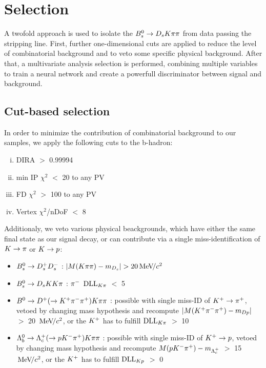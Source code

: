 \section{Selection}

A twofold approach is used to isolate the ${{B}^0_{s}}\rightarrow{\ensuremath{{D}_{s}}}{\ensuremath{K}}{\ensuremath{\pi}}{\ensuremath{\pi}}$ from data passing the stripping line. 
First, further one-dimensional cuts are applied to reduce the level of combinatorial background and to veto some specific physical background. 
After that, a multivariate analysis selection is performed, combining multiple variables to train a neural network and create a powerfull discriminator between signal and background. 

\subsection{Cut-based selection}

In order to minimize the contribution of combinatorial background to our samples, we apply the following cuts to the b-hadron:

\begin{enumerate}[(i)]

\item DIRA $>$ 0.99994

\item min IP $\chi^{2}$ $<$ 20 to any PV

\item FD $\chi^{2}$ $>$ 100 to any PV

\item Vertex $\chi^{2}$/nDoF $<$ 8 

\end{enumerate}    


Additionaly, we veto various physical beackgrounds, which have either the same final state as our signal decay, or can contribute via a single miss-identification of ${K}\rightarrow{\ensuremath{\pi}}$ or ${K}\rightarrow{\ensuremath{p}}$:

\begin{itemize}

\item ${{B}^0_{s}}\rightarrow{\ensuremath{{D}^+_{s}}}{\ensuremath{{D}^-_{s}}}$ : $|M({K}{\pi}{\pi}) - m_{{{D}_{s}}}| > 20 {\mathrm{\,Me\kern -0.1em V\!/}c^2}$ 

\item ${{B}^0_{s}}\rightarrow{\ensuremath{{D}_{s}}}{\ensuremath{K}}{\ensuremath{K}}{\ensuremath{\pi}}$ : ${{\pi}^-}$ $\mathrm{DLL}_{{K}{\pi}}$ $<$ 5 

\item ${{B}^0}\rightarrow{\ensuremath{{D}^+}}(\rightarrow{\ensuremath{{K}^+}}{\ensuremath{{\pi}^-}}{\ensuremath{{\pi}^+}}){K}{\pi}{\pi}$ : possible with single miss-ID of ${{K}^+}\rightarrow{\ensuremath{{\pi}^+}}$, vetoed by changing mass hypothesis and recompute $|M({{K}^+}{{\pi}^-}{{\pi}^+}) - m_{Dp}|$ $>$ 20 ${\mathrm{\,Me\kern -0.1em V\!/}c^2}$, 
or the ${{K}^+}$ has to fulfill $\mathrm{DLL}_{{K}{\pi}}$ $>$ 10

\item ${{\Lambda}^0_{b}}\rightarrow{\ensuremath{{\Lambda}^+_{c}}}(\rightarrow{\ensuremath{p}}{\ensuremath{{K}^-}}{\ensuremath{{\pi}^+}}){K}{\pi}{\pi}$ : possible with single miss-ID of ${{K}^+}\rightarrow{\ensuremath{p}}$, vetoed by changing mass hypothesis and recompute $M({p}{{K}^-}{{\pi}^+}) - m_{{{\Lambda}^+_{c}}}$ $>$ 15 ${\mathrm{\,Me\kern -0.1em V\!/}c^2}$, 
or the ${{K}^+}$ has to fulfill $\mathrm{DLL}_{{K}{p}}$ $>$ 0  

\end{itemize} 


